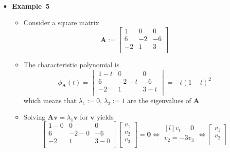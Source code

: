 \documentclass[12pt,a4paper]{article}
\begin{document}
\begin{itemize}
\clearpage
\item \textbf{Example~5}
  \begin{itemize}
  \item Consider a square matrix
    \begin{equation}\nonumber%
      \bm{A} :=
      \begin{bmatrix}
        1 & 0 & 0 \\
        6 & -2 & -6 \\
        -2 & 1 & 3 \\
      \end{bmatrix}
    \end{equation}
  \item The characteristic polynomial is
    \begin{equation}\nonumber%
      \phi_{\bm{A}}(t) =
      \begin{vmatrix}
        1-t & 0 & 0 \\
        6 & -2-t & -6 \\
        -2 & 1 & 3-t \\
      \end{vmatrix}
      =
      -t(1-t)^{2}
    \end{equation}
    which means that
    $\lambda_{1}:=0$,
    $\lambda_{2}:=1$
    are the eigenvalues of $\bm{A}$
  \item Solving $\bm{A}\bm{v}=\lambda_{1}\bm{v}$ for $\bm{v}$ yields
    \begin{equation}\nonumber%
      \begin{bmatrix}
        1-0 & 0 & 0 \\
        6 & -2-0 & -6 \\
        -2 & 1 & 3-0 \\
      \end{bmatrix}
      \begin{bmatrix}
        v_{1} \\
        v_{2} \\
        v_{3} \\
      \end{bmatrix}
      = \bm{0}
      \iff
      \begin{matrix*}[l]
        v_{1} = 0 \\
        v_{2} = -3v_{3} \\
      \end{matrix*}
      \iff
      \begin{bmatrix}
        v_{1} \\
        v_{2} \\

\end{bmatrix}
\end{equation}
\end{itemize}
\end{itemize}
\end{document}

